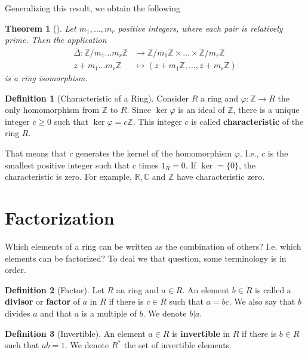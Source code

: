 \documentclass[12pt,a4paper]{article}
\newtheorem{theorem}{Theorem}[section]
\theoremstyle{definition}
\newtheorem{definition}{Definition}[section]
\begin{document}
Generalizing this result, we obtain the following 
\begin{theorem}[]
Let $m_1, \ldots, m_r$ positive integers, where each pair is relatively prime. Then the application
\begin{equation*}
\begin{aligned}
\bar{\Delta} : \mathbb{Z}/m_1\ldots m_r \mathbb{Z} & \to \mathbb{Z}/m_1\mathbb{Z} \times \ldots \times \mathbb{Z}/m_r \mathbb{Z} \\
z+m_1\ldots m_r \mathbb{Z} & \mapsto (z+m_1\mathbb{Z}, \ldots, z+m_r\mathbb{Z})
\end{aligned}
\end{equation*}
is a ring isomorphism.
\end{theorem}

\begin{definition}[Characteristic of a Ring]
Consider $R$ a ring and $\varphi: \mathbb{Z} \to R$ the only homomorphism from $\mathbb{Z}$ to $R$. Since $\ker \varphi$ is an ideal of $\mathbb{Z}$, there is a unique integer $c \geq 0$ such that $\ker \varphi = c \mathbb{Z}$. This integer $c$ is called \textbf{characteristic} of the ring $R$.
\end{definition}

That means that $c$ generates the kernel of the homomorphism $\varphi$. I.e., $c$ is the smallest positive integer such that $c$ times $1_R = 0$. If $\ker = \{ 0 \}$, the characteristic is zero. For example, $\mathbb{R}, \mathbb{C}$ and $\mathbb{Z}$ have characteristic zero.

\section{Factorization}

Which elements of a ring can be written as the combination of others? I.e. which elements can be factorized? To deal we that question, some terminology is in order.

\begin{definition}[Factor]
Let $R$ an ring and $a \in R$. An element $b \in R$ is called a \textbf{divisor} or \textbf{factor} of $a$ in $R$ if there is $c \in R$ such that $a=bc$. We also say that $b$ divides $a$ and that $a$ is a multiple of $b$. We denote $b | a$.
\end{definition}

\begin{definition}[Invertible]
An element $a \in R$ is \textbf{invertible} in $R$ if there is $b \in R$ such that $ab = 1$. We denote $R^{\ast}$ the set of invertible elements.
\end{definition}
\end{document}
